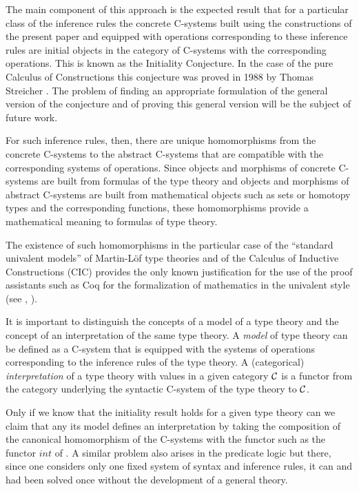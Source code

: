 \documentclass[11pt]{article}
\begin{document}
The main component of this approach is the expected result that for a particular class of the inference rules the concrete C-systems built using the constructions of the present paper and equipped with operations corresponding to these inference rules are initial objects in the category of C-systems with the corresponding operations. This is known as the Initiality Conjecture. In the case of the pure Calculus of Constructions this conjecture was proved in 1988 by Thomas Streicher \cite{Streicher}. The problem of finding an appropriate formulation of the general version of the conjecture and of proving this general version will be the subject of future work. 

For such inference rules, then, there are unique homomorphisms from the concrete C-systems to the abstract C-systems that are compatible with the corresponding systems of operations. Since objects and morphisms of concrete C-systems are built from formulas of the type theory and objects and morphisms of abstract C-systems are built from mathematical objects such as sets or homotopy types and the corresponding functions, these homomorphisms provide a mathematical meaning to formulas of type theory. 

The existence of such homomorphisms in the particular case of the ``standard univalent models'' of  Martin-L\"{o}f type theories and of the Calculus of Inductive Constructions (CIC) provides the only known justification for the use of the proof assistants such as Coq for the formalization of mathematics in the univalent style (see \cite{UniMath}, \cite{UniMath2015}). 

It is important to distinguish the concepts of a model of a type theory and the concept of an interpretation of the same type theory. A {\em model} of type theory can be defined as a C-system that is equipped with the systems of operations corresponding to the inference rules of the type theory. A (categorical) {\em interpretation} of a type theory with values in a given category $\cal C$ is a functor from the category underlying the syntactic C-system of the type theory to $\cal C$. 

Only if we know that the initiality result holds for a given type theory can we claim that any its model defines an interpretation by taking the composition of the canonical homomorphism of the C-systems with the functor such as the functor $int$ of \cite{Cfromauniverse}. A similar problem also arises in the predicate logic but there, since one considers only one fixed system of syntax and inference rules, it can and had been solved once without the development of a general theory. 
\end{document}
